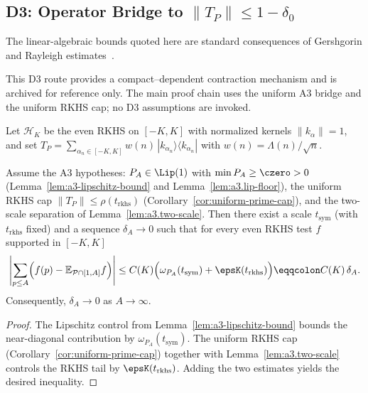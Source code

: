 \subsection{D3: Operator Bridge to \texorpdfstring{$\|T_P\|\le 1-\delta_0$}{||T\_P|| <= 1 - delta0}}\label{d3:sec:D3-operator}

The linear-algebraic bounds quoted here are standard consequences of Gershgorin and Rayleigh estimates~\cite{HornJohnson2013,Varga2004}.
\begin{remark}
This D3 route provides a compact--dependent contraction mechanism and is archived for reference only.
The main proof chain uses the uniform A3 bridge and the uniform RKHS cap; no D3 assumptions are invoked.
\end{remark}

Let $\mathcal H_K$ be the even RKHS on $[-K,K]$ with normalized kernels $\|k_\alpha\|=1$, and set
\(
T_P = \sum_{\alpha_n\in[-K,K]} w(n)\,|k_{\alpha_n}\rangle\!\langle k_{\alpha_n}|
\)
with $w(n)=\Lambda(n)/\sqrt n$.

\begin{lemma}\label{d3:lem:D3-dispersion}
Assume the A3 hypotheses: $P_A\in\Lip(1)$ with $\min P_A\ge \czero>0$ (Lemma~\ref{lem:a3-lipschitz-bound} and Lemma~\ref{lem:a3.lip-floor}), the uniform RKHS cap $\|T_P\|\le \rho(t_{\mathrm{rkhs}})$ (Corollary~\ref{cor:uniform-prime-cap}), and the two-scale separation of Lemma~\ref{lem:a3.two-scale}. Then there exist a scale $t_{\mathrm{sym}}$ (with $t_{\mathrm{rkhs}}$ fixed) and a sequence $\delta_A\to0$ such that for every even RKHS test $f$ supported in $[-K,K]$
\[
  \Biggl|\sum_{p\le A}\Bigl(f(p)-\mathbb{E}_{\mathcal{P}\cap[1,A]}f\Bigr)\Biggr|
  \le C(K)\Bigl(\omega_{P_A}(t_{\mathrm{sym}})+\epsK(t_{\mathrm{rkhs}})\Bigr)
  \eqqcolon C(K)\,\delta_A.
\]
Consequently, $\delta_A\to0$ as $A\to\infty$.
\end{lemma}

\begin{proof}
The Lipschitz control from Lemma~\ref{lem:a3-lipschitz-bound} bounds the near-diagonal contribution by $\omega_{P_A}(t_{\mathrm{sym}})$. The uniform RKHS cap (Corollary~\ref{cor:uniform-prime-cap}) together with Lemma~\ref{lem:a3.two-scale} controls the RKHS tail by $\epsK(t_{\mathrm{rkhs}})$. Adding the two estimates yields the desired inequality.
\end{proof}


